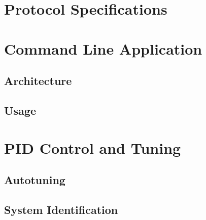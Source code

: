 \blindtext

\section{Protocol Specifications}

\blindtext

\blindtext

\section{Command Line Application}

\subsection{Architecture}

\blindtext

\subsection{Usage}

\blindtext

\section{PID Control and Tuning}

\subsection{Autotuning}

\blindtext

\subsection{System Identification}

\blindtext
